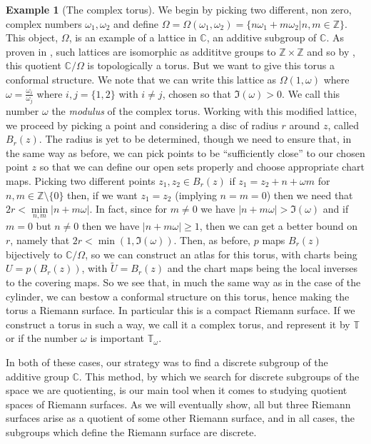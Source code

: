 \documentclass[11pt]{report}
\theoremstyle{definition}
\newtheorem*{example*}{Example}
\begin{document}
\begin{example*}[The complex torus]
We begin by picking two different, non zero, complex numbers $\omega_1, \omega_2$ and define $\Omega = \Omega(\omega_1,\omega_2) = \{n\omega_1 + m\omega_2 \vert n,m \in \mathbb{Z} \}$. This object, $\Omega$, is an example of a lattice in $\mathbb{C}$, an additive subgroup of $\mathbb{C}$. As proven in \cite[p.58]{comfun}, such lattices are isomorphic as addititve groups to $\mathbb{Z} \times \mathbb{Z}$ and so by \cite[Example 1.43]{Hatchers}, this quotient $\mathbb{C}/\Omega$ is topologically a torus. But we want to give this torus a conformal structure. We note that we can write this lattice as $\Omega(1,\omega)$ where $\omega=\frac{\omega_i}{\omega_j}$ where $i,j = \{1, 2\}$ with $i \neq j$, chosen so that $\Im(\omega) > 0$. We call this number $\omega$ the \emph{modulus} of the complex torus. Working with this modified lattice, we proceed by picking a point and considering a disc of radius $r$ around $z$, called $B_r(z)$. The radius is yet to be determined, though we need to ensure that, in the same way as before, we can pick points to be ``sufficiently close'' to our chosen point $z$ so that we can define our open sets properly and choose appropriate chart maps. Picking two different points $z_1,z_2 \in B_r(z)$ if $z_1 = z_2 + n + \omega m$ for $n,m \in \mathbb{Z}\setminus \{0\}$ then, if we want $z_1=z_2$ (implying $n=m=0$) then we need that $2r < \min\limits_{n,m}|n + m\omega|$. In fact, since for $m \neq 0$ we have $|n+m\omega| > \Im(\omega)$ and if $m=0$ but $n\neq 0$ then we have $|n + m\omega| \geq 1$, then we can get a better bound on $r$, namely that $2r < \min(1, \Im(\omega))$. Then, as before, $p$ maps $B_r(z)$ bijectively to $\mathbb{C}/\Omega$, so we can construct an atlas for this torus, with charts being $U = p(B_r(z))$, with $\widetilde{U} = B_r(z)$ and the chart maps being the local inverses to the covering maps. So we see that, in much the same way as in the case of the cylinder, we can bestow a conformal structure on this torus, hence making the torus a Riemann surface. In particular this is a compact Riemann surface. If we construct a torus in such a way, we call it a complex torus, and represent it by $\mathbb{T}$ or if the number $\omega$ is important $\mathbb{T}_{\omega}$.
\end{example*}

In both of these cases, our strategy was to find a discrete subgroup of the additive group $\mathbb{C}$. This method, by which we search for discrete subgroups of the space we are quotienting, is our main tool when it comes to studying quotient spaces of Riemann surfaces. As we will eventually show, all but three Riemann surfaces arise as a quotient of some other Riemann surface, and in all cases, the subgroups which define the Riemann surface are discrete. 
\end{document}

